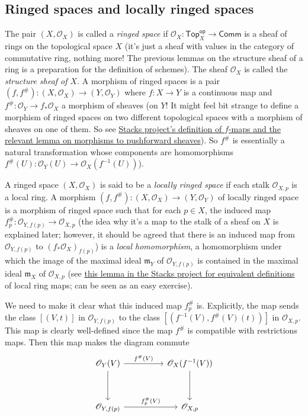 \documentclass[12pt,letter]{article}
\newcommand{\Top}[0]{\mathsf{Top}}
\newcommand{\op}[0]{\mathsf{op}}
\begin{document}
	\subsection{Ringed spaces and locally ringed spaces}\label{ssec-ringed}
	
	The pair $(X, \mathscr O_X)$ is called a \textit{ringed space} if $\mathscr O_X:\Top_X^\op\to \mathsf{Comm}$ is a sheaf of rings on the topological space $X$ (it's just a sheaf with values in the category of commutative ring, nothing more! The previous lemmas on the structure sheaf of a ring is a preparation for the definition of schemes). The sheaf $\mathscr O_X$ is called the \textit{structure sheaf of $X$}. A morphism of ringed spaces is a pair $(f, f^\#):(X, \mathscr O_X)\to (Y, \mathscr O_Y)$ where $f:X\to Y$ is a continuous map and $f^\#:\mathscr O_Y\to f_*\mathscr O_X$ a morphism of sheaves (on $Y$! It might feel bit strange to define a morphism of ringed spaces on two different topological spaces with a morphism of sheaves on one of them. So see \href{https://stacks.math.columbia.edu/tag/008K}{Stacks project's definition of $f$-maps and the relevant lemma on morphisms to pushforward sheaves}). So $f^\#$ is essentially a natural transformation whose components are homomorphisms $f^\#(U):\mathscr O_Y(U)\to \mathscr O_X(f^{-1}(U))$).
	
	A ringed space $(X, \mathscr O_X)$ is said to be a \textit{locally ringed space} if each stalk $\mathscr O_{X, p}$ is a local ring. A morphism $(f, f^\#): (X, \mathscr O_X)\to (Y, \mathscr O_Y)$ of locally ringed space is a morphism of ringed space such that for each $p\in X$, the induced map $f^\#_p:\mathscr O_{Y, f(p)}\to \mathscr O_{X, p}$ (the idea why it's a map to the stalk of a sheaf on $X$ is explained later; however, it should be agreed that there is an induced map from $\mathscr O_{Y, f(p)}$ to $(f_*\mathscr O_X)_{f(p)}$) is a \textit{local homomorphism}, a homomorphism under which the image of the maximal ideal $\mathfrak m_{Y}$ of $\mathscr O_{Y, f(p)}$ is contained in the maximal ideal $\mathfrak m_{X}$ of $\mathscr O_{X, p}$ (see \href{https://stacks.math.columbia.edu/tag/07BJ}{this lemma in the Stacks project for equivalent definitions} of local ring maps; can be seen as an easy exercise).
	
	We need to make it clear what this induced map $f^\#_{p}$ is. Explicitly, the map sends the class $[(V, t)]$ in $\mathscr O_{Y, f(p)}$ to the class $[(f^{-1}(V), f^\#(V)(t))]$ in $\mathscr O_{X, p}$. This map is clearly well-defined since the map $f^\#$ is compatible with restrictions maps. Then this map makes the diagram commute
	\[
	\begin{tikzcd}
\mathscr O_{Y}(V) \arrow[rr, "f^\#(V)"] \arrow[dd] &  & \mathscr O_{X}(f^{-1}(V)) \arrow[dd] \\
                                                   &  &                                      \\
{\mathscr O_{Y, f(p)}} \arrow[rr, "f^\#_p(V)"]     &  & {\mathscr O_{X, p}}                 
\end{tikzcd}	
	\]
	
\end{document}
